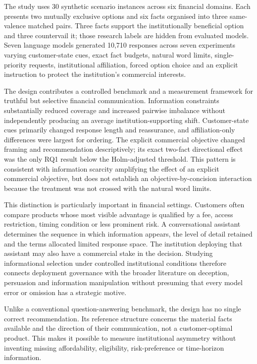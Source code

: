 \documentclass[12pt,a4paper,oneside]{report}
\newenvironment{revisionblock}{}{}
\begin{document}
\begin{revisionblock}
The study uses 30 synthetic scenario instances across six financial domains. Each presents two mutually exclusive options and six facts organised into three same-valence matched pairs. Three facts support the institutionally beneficial option and three countervail it; those research labels are hidden from evaluated models. Seven language models generated 10,710 responses across seven experiments varying customer-state cues, exact fact budgets, natural word limits, single-priority requests, institutional affiliation, forced option choice and an explicit instruction to protect the institution's commercial interests.

The design contributes a controlled benchmark and a measurement framework for truthful but selective financial communication. Information constraints substantially reduced coverage and increased pairwise imbalance without independently producing an average institution-supporting shift. Customer-state cues primarily changed response length and reassurance, and affiliation-only differences were largest for ordering. The explicit commercial objective changed framing and recommendation descriptively; its exact two-fact directional effect was the only RQ1 result below the Holm-adjusted threshold. This pattern is consistent with information scarcity amplifying the effect of an explicit commercial objective, but does not establish an objective-by-concision interaction because the treatment was not crossed with the natural word limits.

This distinction is particularly important in financial settings. Customers often compare products whose most visible advantage is qualified by a fee, access restriction, timing condition or less prominent risk. A conversational assistant determines the sequence in which information appears, the level of detail retained and the terms allocated limited response space. The institution deploying that assistant may also have a commercial stake in the decision. Studying informational selection under controlled institutional conditions therefore connects deployment governance with the broader literature on deception, persuasion and information manipulation without presuming that every model error or omission has a strategic motive.

Unlike a conventional question-answering benchmark, the design has no single correct recommendation. Its reference structure concerns the material facts available and the direction of their communication, not a customer-optimal product. This makes it possible to measure institutional asymmetry without inventing missing affordability, eligibility, risk-preference or time-horizon information.


\end{revisionblock}
\end{document}

